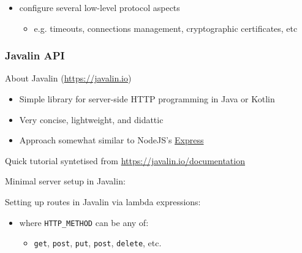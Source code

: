 \documentclass[presentation]{beamer}\mode<presentation>{\usetheme{AMSBolognaFC}}
\begin{document}
\begin{frame}
\begin{itemize}
        \vfill

        \item configure several low-level protocol aspects
        \begin{itemize}
            \item e.g. timeouts, connections management, cryptographic certificates, etc
        \end{itemize}
    \end{itemize}
\end{frame}

\begin{frame}[allowframebreaks]
    \frametitle{Javalin API}

    \begin{block}{About Javalin (\url{https://javalin.io})}
        \begin{itemize}
            \item Simple library for server-side HTTP programming in Java or Kotlin
            \item Very concise, lightweight, and \alert{didattic}
            \item Approach somewhat similar to NodeJS's \href{https://expressjs.com/it/}{Express}
        \end{itemize}
    \end{block}

    \begin{alertblock}{Quick tutorial syntetised from}
        \url{https://javalin.io/documentation}
    \end{alertblock}

    \framebreak

    Minimal server setup in Javalin:
    

    \framebreak

    Setting up routes in Javalin via lambda expressions:
    

    \begin{itemize}
        \item where \texttt{HTTP\_METHOD} can be any of:
        \begin{itemize}
            \item[] \texttt{get}, \texttt{post}, \texttt{put}, \texttt{post}, \texttt{delete}, etc.
        \end{itemize}
    \end{itemize}


\end{frame}
\end{document}
